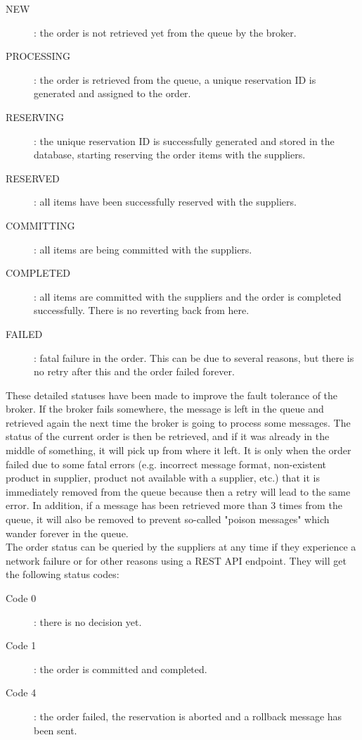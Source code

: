 \documentclass[10pt,a4paper,kul]{kulakarticle} %
\begin{document}
		\begin{description}
			\item[NEW]: the order is not retrieved yet from the queue by the broker.
			\item[PROCESSING]: the order is retrieved from the queue, a unique reservation ID is generated and assigned to the order.
			\item[RESERVING]: the unique reservation ID is successfully generated and stored in the database, starting reserving the order items with the suppliers.
			\item[RESERVED]: all items have been successfully reserved with the suppliers.
			\item[COMMITTING]: all items are being committed with the suppliers.
			\item[COMPLETED]: all items are committed with the suppliers and the order is completed successfully. There is no reverting back from here.
			\item[FAILED]: fatal failure in the order. This can be due to several reasons, but there is no retry after this and the order failed forever.
		\end{description}
		
		\noindent These detailed statuses have been made to improve the fault tolerance of the broker. If the broker fails somewhere, the message is left in the queue and retrieved again the next time the broker is going to process some messages. The status of the current order is then be retrieved, and if it was already in the middle of something, it will pick up from where it left. It is only when the order failed due to some fatal errors (e.g. incorrect message format, non-existent product in supplier, product not available with a supplier, etc.) that it is immediately removed from the queue because then a retry will lead to the same error. In addition, if a message has been retrieved more than 3 times from the queue, it will also be removed to prevent so-called "poison messages" which wander forever in the queue.\\
		\newline
		The order status can be queried by the suppliers at any time if they experience a network failure or for other reasons using a REST API endpoint. They will get the following status codes:
		 
		 \begin{description}
		 	\item[Code 0]: there is no decision yet.
		 	\item[Code 1]: the order is committed and completed.
		 	\item[Code 4]: the order failed, the reservation is aborted and a rollback message has been sent.
		 \end{description}
		
\end{document}

